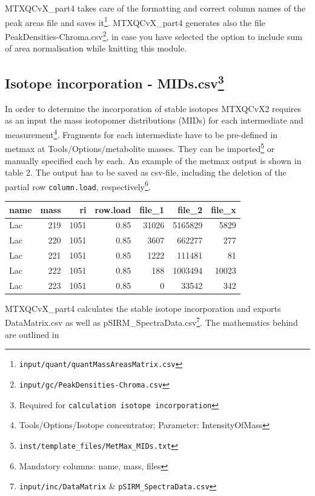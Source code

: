 \documentclass[]{book}
\let\rmarkdownfootnote\footnote%
\def\footnote{\protect\rmarkdownfootnote}
\theoremstyle{definition}
\theoremstyle{definition}
\theoremstyle{definition}
\theoremstyle{remark}
\begin{document}
MTXQCvX\_part4 takes care of the formatting and correct column names of
the peak areas file and saves it\footnote{\texttt{input/quant/quantMassAreasMatrix.csv}}.
MTXQCvX\_part4 generates also the file
PeakDensities-Chroma.csv\footnote{\texttt{input/gc/PeakDensities-Chroma.csv}},
in case you have selected the option to include sum of area
normalisation while knitting this module.

\subsection[Isotope incorporation - MIDs.csv]{\texorpdfstring{Isotope
incorporation - MIDs.csv\footnote{Required for
  \texttt{calculation\ isotope\ incorporation}}}{Isotope incorporation - MIDs.csv}}\label{isotope-incorporation---mids.csv}

In order to determine the incorporation of stable isotopes MTXQCvX2
requires as an input the mass isotopomer distributions (MIDs) for each
intermediate and measurement\footnote{Tools/Options/Isotope
  concentrator; Parameter: IntensityOfMass}. Fragments for each
intermediate have to be pre-defined in metmax at
Tools/Options/metabolite masses. They can be imported\footnote{\texttt{inst/template\_files/MetMax\_MIDs.txt}}
or manually specified each by each. An example of the metmax output is
shown in table 2. The output has to be saved as csv-file, including the
deletion of the partial row \texttt{column.load}, respectively\footnote{Mandatory
  columns: name, mass, files}.

\begin{tabular}{l|r|r|r|r|r|r}
\hline
name & mass & ri & row.load & file\_1 & file\_2 & file\_x\\
\hline
Lac & 219 & 1051 & 0.85 & 31026 & 5165829 & 5829\\
\hline
Lac & 220 & 1051 & 0.85 & 3607 & 662277 & 277\\
\hline
Lac & 221 & 1051 & 0.85 & 1222 & 111481 & 81\\
\hline
Lac & 222 & 1051 & 0.85 & 188 & 1003494 & 10023\\
\hline
Lac & 223 & 1051 & 0.85 & 0 & 33542 & 342\\
\hline
\end{tabular}

MTXQCvX\_part4 calculates the stable isotope incorporation and exports
DataMatrix.csv as well as pSIRM\_SpectraData.csv\footnote{\texttt{input/inc/DataMatrix}
  \& \texttt{pSIRM\_SpectraData.csv}}. The mathematics behind are
outlined in \citep{Pietzke2014}
\end{document}

